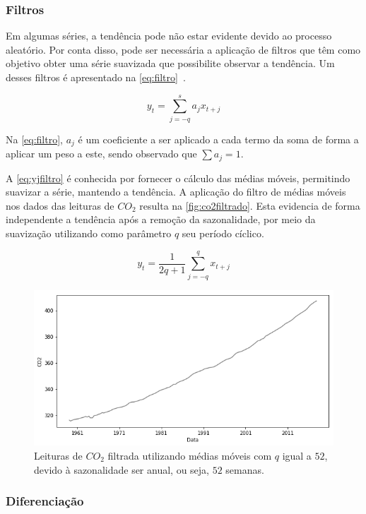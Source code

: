 \documentclass[
    12pt,
    oneside,
    a4paper,
    english,
    brazil
]{abntex2}
\begin{document}
\subsubsection{Filtros}

Em  algumas séries, a  tendência pode  não estar  evidente  devido ao  processo
aleatório. Por conta disso, pode ser  necessária a aplicação de filtros que têm
como objetivo obter  uma série suavizada que possibilite  observar a tendência.
Um desses filtros é apresentado na \autoref{eq:filtro}~\cite{ehlers}.

\begin{equation}
    \label{eq:filtro}
    y_t = \sum_{j = -q}^{s}{a_{j}x_{t+j}}
\end{equation}

Na \autoref{eq:filtro}, $a_j$  é um coeficiente a ser aplicado  a cada termo da
soma de forma a aplicar um peso a este, sendo observado que $\sum{a_j} = 1$.

A  \autoref{eq:yjfiltro}  é  conhecida  por   fornecer  o  cálculo  das  médias
móveis,  permitindo  suavizar  a  série,  mantendo  a  tendência.  A  aplicação
do  filtro  de médias  móveis  nos  dados das  leituras  de  $CO_2$ resulta  na
\autoref{fig:co2filtrado}. Esta evidencia de forma independente a tendência após
a remoção da sazonalidade, por meio da suavização utilizando como parâmetro $q$
seu período cíclico.

\begin{equation}
    \label{eq:yjfiltro}
    y_t = \frac{1}{2q + 1}\sum_{j=-q}^{q}{x_{t+j}}
\end{equation}

\begin{figure}[ht]
    \centering
    \caption{Leituras de $CO_2$ filtrada utilizando médias móveis com $q$ igual
        a $52$, devido à sazonalidade ser anual, ou seja, $52$
        semanas.}\label{fig:co2filtrado}
    \includegraphics[width=.5\linewidth]{images/co2_filtered.png}
\end{figure}

\subsubsection{Diferenciação}\label{sec:diff}
\end{document}
